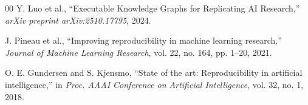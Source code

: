 \documentclass[conference]{IEEEtran}
\begin{document}
\begin{thebibliography}{00}
Y. Luo et al., ``Executable Knowledge Graphs for Replicating AI Research,'' \textit{arXiv preprint arXiv:2510.17795}, 2024.

J. Pineau et al., ``Improving reproducibility in machine learning research,'' \textit{Journal of Machine Learning Research}, vol. 22, no. 164, pp. 1--20, 2021.

O. E. Gundersen and S. Kjensmo, ``State of the art: Reproducibility in artificial intelligence,'' in \textit{Proc. AAAI Conference on Artificial Intelligence}, vol. 32, no. 1, 2018.

\end{thebibliography}

\balance
\end{document}
